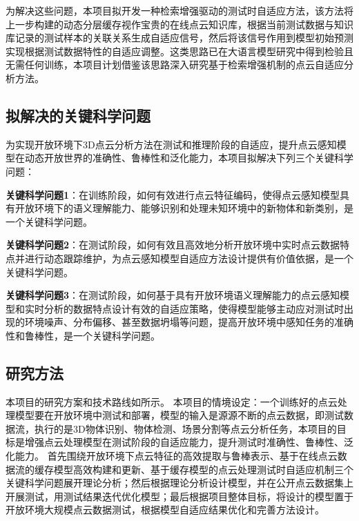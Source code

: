 \documentclass[12pt]{article}
\newcommand{\myEmph}[1]{\textbf{\textcolor[rgb]{0,0,0.25}{#1}}}
\begin{document}
为解决这些问题，本项目拟开发一种检索增强驱动的测试时自适应方法，该方法将上一步构建的动态分层缓存视作宝贵的在线点云知识库，根据当前测试数据与知识库记录的测试样本的关联关系生成自适应信号，然后将该信号作用到模型初始预测实现根据测试数据特性的自适应调整。这类思路已在大语言模型研究中得到检验且无需任何训练，本项目计划借鉴该思路深入研究基于检索增强机制的点云自适应分析方法。


\subsection{拟解决的关键科学问题}


为实现开放环境下3D点云分析方法在测试和推理阶段的自适应，提升点云感知模型在动态开放世界的准确性、鲁棒性和泛化能力，本项目拟解决下列三个关键科学问题：

\myEmph{关键科学问题1}：在训练阶段，如何有效进行点云特征编码，使得点云感知模型具有开放环境下的语义理解能力、能够识别和处理未知环境中的新物体和新类别，是一个关键科学问题。

\myEmph{关键科学问题2}：在测试阶段，如何有效且高效地分析开放环境中实时点云数据特点并进行动态跟踪维护，为点云感知模型自适应方法设计提供有价值依据，是一个关键科学问题。

\myEmph{关键科学问题3}：在测试阶段，如何基于具有开放环境语义理解能力的点云感知模型和实时分析的数据特点设计有效的自适应策略，使得模型能够主动应对测试时出现的环境噪声、分布偏移、甚至数据坍塌等问题，提高开放环境中感知任务的准确性和鲁棒性，是一个关键科学问题。



\subsection{研究方法}
本项目的研究方案和技术路线如所示。
本项目的情境设定：一个训练好的点云处理模型要在开放环境中测试和部署，模型的输入是源源不断的点云数据，即测试数据流，执行的是3D物体识别、物体检测、场景分割等点云分析任务，本项目的目标是增强点云处理模型在测试阶段的自适应能力，提升测试时准确性、鲁棒性、泛化能力。
首先围绕开放环境下点云特征的高效提取与鲁棒表示、基于在线点云数据流的缓存模型高效构建和更新、基于缓存模型的点云处理测试时自适应机制三个关键科学问题展开理论分析；然后根据理论分析设计模型，并在公开点云数据集上开展测试，用测试结果迭代优化模型；最后根据项目整体目标，将设计的模型置于开放环境大规模点云数据测试，根据模型自适应结果优化和完善方法设计。
\end{document}
